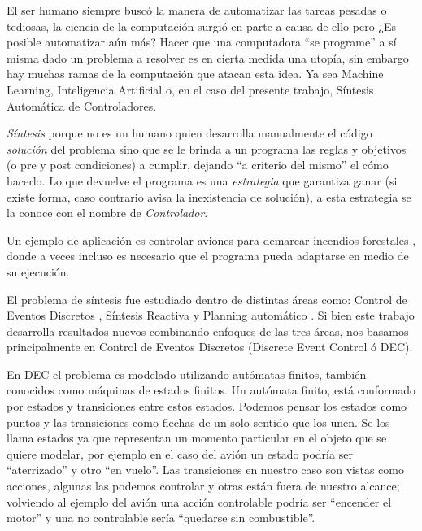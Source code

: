 
El ser humano siempre buscó la manera de automatizar las tareas pesadas o tediosas, la ciencia de la computación surgió en parte a causa de ello pero ¿Es posible automatizar aún más? 
Hacer que una computadora ``se programe'' a sí misma dado un problema a resolver es en cierta medida una utopía, sin embargo hay muchas ramas de la computación que atacan esta idea. Ya sea Machine Learning, Inteligencia Artificial o, en el caso del presente trabajo, Síntesis Automática de Controladores.

\textit{Síntesis} porque no es un humano quien desarrolla manualmente el código \textit{solución} del problema sino que se le brinda a un programa las reglas y objetivos (o pre y post condiciones) a cumplir, dejando ``a criterio del mismo'' el cómo hacerlo. Lo que devuelve el programa es una \textit{estrategia} que garantiza ganar (si existe forma, caso contrario avisa la inexistencia de solución), a esta estrategia se la conoce con el nombre de \textit{Controlador}.

Un ejemplo de aplicación es controlar aviones para demarcar incendios forestales \cite{Zudaire:aviones}, donde a veces incluso es necesario que el programa pueda adaptarse en medio de su ejecución.

El problema de síntesis fue estudiado dentro de distintas áreas como: Control de Eventos Discretos \cite{Ramadge:1987:SC}, Síntesis Reactiva \cite{Pnueli:1989:RS} y Planning automático \cite{Nau:2004:AP}. 
Si bien este trabajo desarrolla resultados nuevos combinando enfoques de las tres áreas, nos basamos principalmente en Control de Eventos Discretos (Discrete Event Control ó DEC).

 En DEC el problema es modelado utilizando autómatas finitos, también conocidos como máquinas de estados finitos. 
Un autómata finito, está conformado por estados y transiciones entre estos estados. Podemos pensar los estados como puntos y las transiciones como flechas de un solo sentido que los unen. Se los llama estados ya que representan un momento particular en el objeto que se quiere modelar, por ejemplo en el caso del avión un estado podría ser ``aterrizado'' y otro ``en vuelo''. Las transiciones en nuestro caso son vistas como acciones, algunas las podemos controlar y otras están fuera de nuestro alcance; volviendo al ejemplo del avión una acción controlable podría ser ``encender el motor'' y una no controlable sería ``quedarse sin combustible''.

